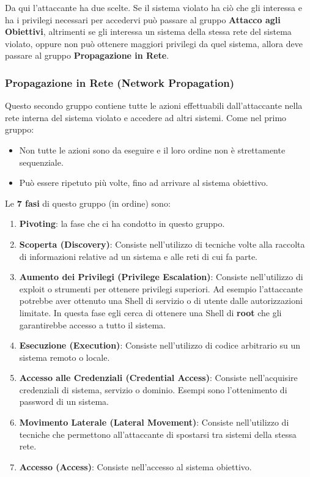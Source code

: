 \documentclass{article}
\begin{document}
Da qui l'attaccante ha due scelte. Se il sistema violato ha ciò che gli interessa e ha i privilegi necessari per accedervi può passare al gruppo \textbf{Attacco agli Obiettivi}, altrimenti se gli interessa un sistema della stessa rete del sistema violato, oppure non può ottenere maggiori privilegi da quel sistema, allora deve passare al gruppo \textbf{Propagazione in Rete}.

\subsubsection{Propagazione in Rete (Network Propagation)}
Questo secondo gruppo contiene tutte le azioni effettuabili dall'attaccante nella rete interna del sistema violato e accedere ad altri sistemi. Come nel primo gruppo:
\begin{itemize}
    \item Non tutte le azioni sono da eseguire e il loro ordine non è strettamente sequenziale.
    \item Può essere ripetuto più volte, fino ad arrivare al sistema obiettivo.
\end{itemize}

Le \textbf{7 fasi} di questo gruppo (in ordine) sono:
\begin{enumerate}
    \item \textbf{Pivoting}: la fase che ci ha condotto in questo gruppo.
    \item \textbf{Scoperta (Discovery)}: Consiste nell'utilizzo di tecniche volte alla raccolta di informazioni relative ad un sistema e alle reti di cui fa parte.
    \item \textbf{Aumento dei Privilegi (Privilege Escalation)}: Consiste nell'utilizzo di exploit o strumenti per ottenere privilegi superiori. Ad esempio l'attaccante potrebbe aver ottenuto una Shell di servizio o di utente dalle autorizzazioni limitate. In questa fase egli cerca di ottenere una Shell di \textbf{root} che gli garantirebbe accesso a tutto il sistema.
    \item \textbf{Esecuzione (Execution)}: Consiste nell'utilizzo di codice arbitrario su un sistema remoto o locale.
    \item \textbf{Accesso alle Credenziali (Credential Access)}: Consiste nell'acquisire credenziali di sistema, servizio o dominio. Esempi sono l'ottenimento di password di un sistema.
    \item \textbf{Movimento Laterale (Lateral Movement)}: Consiste nell'utilizzo di tecniche che permettono all'attaccante di spostarsi tra sistemi della stessa rete.
    \item \textbf{Accesso (Access)}: Consiste nell'accesso al sistema obiettivo.
\end{enumerate}
\end{document}
